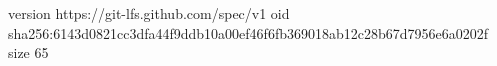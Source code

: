 version https://git-lfs.github.com/spec/v1
oid sha256:6143d0821cc3dfa44f9ddb10a00ef46f6fb369018ab12c28b67d7956e6a0202f
size 65
